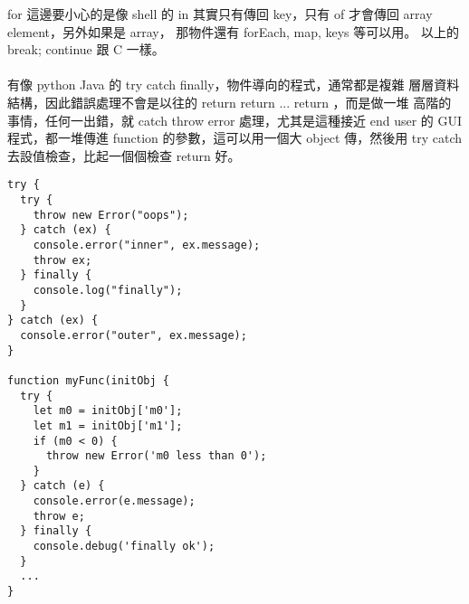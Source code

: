   for 這邊要小心的是像 shell 的 in 其實只有傳回 key，只有 of 才會傳回 array
  element，另外如果是 array， 那物件還有 forEach, map, keys 等可以用。 以上的
  break; continue 跟 C 一樣。
  \\\\
  有像 python Java 的 try catch finally，物件導向的程式，通常都是複雜
  層層資料結構，因此錯誤處理不會是以往的 return return ... return ，而是做一堆
  高階的事情，任何一出錯，就 catch throw error 處理，尤其是這種接近 end user
  的 GUI 程式，都一堆傳進 function 的參數，這可以用一個大 object 傳，然後用
  try catch 去設值檢查，比起一個個檢查 return 好。
  \begin{verbatim}
try {
  try {
    throw new Error("oops");
  } catch (ex) {
    console.error("inner", ex.message);
    throw ex;
  } finally {
    console.log("finally");
  }
} catch (ex) {
  console.error("outer", ex.message);
}

function myFunc(initObj {
  try {
    let m0 = initObj['m0'];
    let m1 = initObj['m1'];
    if (m0 < 0) {
      throw new Error('m0 less than 0');
    }
  } catch (e) {
    console.error(e.message);
    throw e;
  } finally {
    console.debug('finally ok');
  }
  ...
}
  \end{verbatim}

